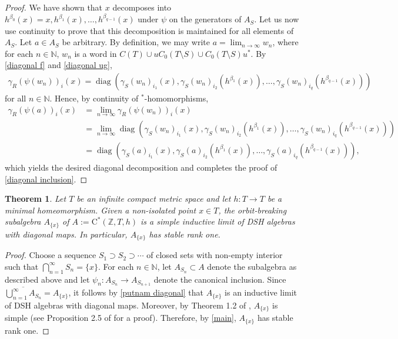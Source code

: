 \documentclass[12pt]{amsart}
\numberwithin{equation}{section}
\newtheorem{theorem}{Theorem}[section]
\theoremstyle{definition}
\theoremstyle{remark}
\newcommand{\diag}{\operatorname{diag}}
\newcommand{\NN}{\mathbb{N}}
\begin{document}
\begin{proof}
	We have shown that $x$ decomposes into $h^{\beta_{0}}(x)=x,h^{\beta_{1}}(x),\ldots,h^{\beta_{q-1}}(x)$ under $\psi$ on the generators of $A_{S}$. Let us now use continuity to prove that this decomposition is maintained for all elements of $A_{S}$. Let $a\in A_{S}$ be arbitrary. By definition, we may write $a=\lim_{n\to\infty}w_{n}$, where for each $n\in\NN$, $w_{n}$ is a word in $C(T)\cup uC_{0}(T\setminus S)\cup C_{0}(T\setminus S)u^{*}$. By \autoref{diagonal f} and \autoref{diagonal ug}, 
	$$
	\begin{aligned}
	\gamma_{R}(\psi(w_{n}))_{i}(x)
	=\diag\left(\gamma_{S}(w_{n})_{i_{1}}(x),\gamma_{S}(w_{n})_{i_{2}}(h^{\beta_{1}}(x)),\ldots,\gamma_{S}(w_{n})_{i_{q}}(h^{\beta_{q-1}}(x))\right)
	\end{aligned}
	$$
	for all $n\in\NN$. Hence, by continuity of $^*$-homomorphisms,
	$$
	\begin{aligned}
	\gamma_{R}(\psi(a))_{i}(x)
	&=\lim_{n\to\infty}\gamma_{R}(\psi(w_{n}))_{i}(x)\\
	&=\lim_{n\to\infty}\diag\left(\gamma_{S}(w_{n})_{i_{1}}(x),\gamma_{S}(w_{n})_{i_{2}}(h^{\beta_{1}}(x)),\ldots,\gamma_{S}(w_{n})_{i_{q}}(h^{\beta_{q-1}}(x))\right)\\
	&=\diag\left(\gamma_{S}(a)_{i_{1}}(x),\gamma_{S}(a)_{i_{2}}(h^{\beta_{1}}(x)),\ldots,\gamma_{S}(a)_{i_{q}}(h^{\beta_{q-1}}(x))\right),
	\end{aligned}
	$$
	which yields the desired diagonal decomposition and completes the proof of \autoref{diagonal inclusion}.
\end{proof}

\begin{theorem}
	\label{Ax}
	Let $T$ be an infinite compact metric space and let $h\colon T\to T$ be a minimal homeomorphism. Given a non-isolated point $x\in T$, the orbit-breaking subalgebra $A_{\{x\}}$ of $A:=\mathrm{C^*}(\mathbb{Z},T,h)$ is a simple inductive limit of DSH algebras with diagonal maps. In particular, $A_{\{x\}}$ has stable rank one.
\end{theorem}

\begin{proof}
	Choose a sequence $S_{1}\supset S_{2}\supset\cdots$ of closed sets with non-empty interior such that $\bigcap_{n=1}^{\infty}S_{n}=\{x\}$. For each $n\in\NN$, let $A_{S_{n}}\subset A$ denote the subalgebra as described above and let $\psi_{n}\colon A_{S_{n}}\to A_{S_{n+1}}$ denote the canonical inclusion. Since $\overline{\bigcup_{n=1}^{\infty}A_{S_{n}}}=A_{\{x\}}$, it follows by \autoref{putnam diagonal} that $A_{\{x\}}$ is an inductive limit of DSH algebras with diagonal maps. Moreover, by Theorem 1.2 of \cite{LP},  $A_{\{x\}}$ is simple (see Proposition 2.5 of \cite{xinP} for a proof). Therefore, by \autoref{main}, $A_{\{x\}}$ has stable rank one.
\end{proof}
\end{document}
